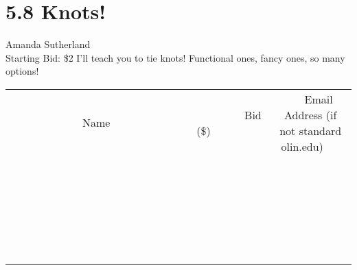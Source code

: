 \documentclass[11pt]{article}
\begin{document}
\section*{5.8 Knots!}
Amanda Sutherland
\\
Starting Bid: \$2
\newline
I'll teach you to tie knots! Functional ones, fancy ones, so many options!
\\[6ex]
\begin{tabular}{c c c}
~~~~~~~~~~~~~Name~~~~~~~~~~~~~ & ~~~~~~~~~Bid (\$)~~~~~~~~~  & ~~~Email Address (if not standard olin.edu)~~~\\
 & & \\
\hline
 & & \\
\hline
 & & \\
\hline
 & & \\
\hline
 & & \\
\hline
 & & \\
\hline
 & & \\
\hline
 & & \\
\hline
 & & \\
\hline
 & & \\
\hline
 & & \\
\hline
 & & \\
\hline
 & & \\
\hline
 & & \\
\hline
 & & \\
\hline
 & & \\
\hline
 & & \\
\hline
 & & \\
\hline
 & & \\
\hline
 & & \\
\hline
 & & \\
\hline
 & & \\
\hline
 & & \\
\hline
 & & \\
\hline
 & & \\
\hline
 & & \\
\hline
\end{tabular}
\newpage
\end{document}
